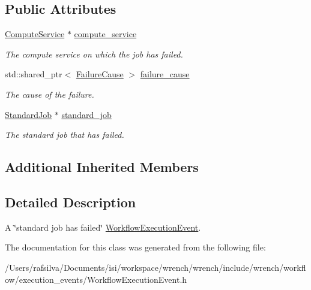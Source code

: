 \subsection*{Public Attributes}
\begin{DoxyCompactItemize}
\item 
\mbox{\label{classwrench_1_1_standard_job_failed_event_a395e9e8b52a22dc996a992da60e2af70}} 
\hyperlink{classwrench_1_1_compute_service}{Compute\+Service} $\ast$ \hyperlink{classwrench_1_1_standard_job_failed_event_a395e9e8b52a22dc996a992da60e2af70}{compute\+\_\+service}
\begin{DoxyCompactList}\small\item\em The compute service on which the job has failed. \end{DoxyCompactList}\item 
\mbox{\label{classwrench_1_1_standard_job_failed_event_afb29868b158656f877f4737de4e8313b}} 
std\+::shared\+\_\+ptr$<$ \hyperlink{classwrench_1_1_failure_cause}{Failure\+Cause} $>$ \hyperlink{classwrench_1_1_standard_job_failed_event_afb29868b158656f877f4737de4e8313b}{failure\+\_\+cause}
\begin{DoxyCompactList}\small\item\em The cause of the failure. \end{DoxyCompactList}\item 
\mbox{\label{classwrench_1_1_standard_job_failed_event_a369dbe7b8d88ec8bbdb8dae7bfc5eeff}} 
\hyperlink{classwrench_1_1_standard_job}{Standard\+Job} $\ast$ \hyperlink{classwrench_1_1_standard_job_failed_event_a369dbe7b8d88ec8bbdb8dae7bfc5eeff}{standard\+\_\+job}
\begin{DoxyCompactList}\small\item\em The standard job that has failed. \end{DoxyCompactList}\end{DoxyCompactItemize}
\subsection*{Additional Inherited Members}


\subsection{Detailed Description}
A \char`\"{}standard job has failed\char`\"{} \hyperlink{classwrench_1_1_workflow_execution_event}{Workflow\+Execution\+Event}. 

The documentation for this class was generated from the following file\+:\begin{DoxyCompactItemize}
\item 
/\+Users/rafsilva/\+Documents/isi/workspace/wrench/wrench/include/wrench/workflow/execution\+\_\+events/Workflow\+Execution\+Event.\+h\end{DoxyCompactItemize}
